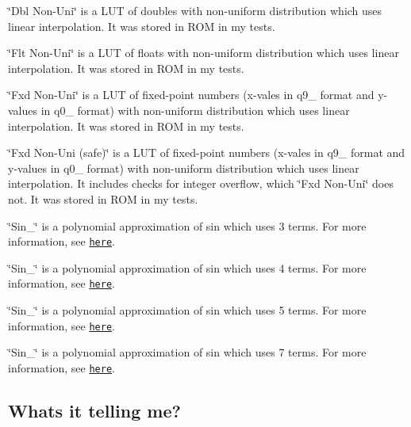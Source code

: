 \begin{DoxyEnumerate}
\item \char`\"{}\+Dbl Non-\/\+Uni\char`\"{} is a L\+UT of doubles with non-\/uniform distribution which uses linear interpolation. It was stored in R\+OM in my tests.
\item \char`\"{}\+Flt Non-\/\+Uni\char`\"{} is a L\+UT of floats with non-\/uniform distribution which uses linear interpolation. It was stored in R\+OM in my tests.
\item \char`\"{}\+Fxd Non-\/\+Uni\char`\"{} is a L\+UT of fixed-\/point numbers (x-\/vales in q9\+\_ format and y-\/values in q0\+\_ format) with non-\/uniform distribution which uses linear interpolation. It was stored in R\+OM in my tests.
\item \char`\"{}\+Fxd Non-\/\+Uni (safe)\char`\"{} is a L\+UT of fixed-\/point numbers (x-\/vales in q9\+\_ format and y-\/values in q0\+\_ format) with non-\/uniform distribution which uses linear interpolation. It includes checks for integer overflow, which \char`\"{}\+Fxd Non-\/\+Uni\char`\"{} does not. It was stored in R\+OM in my tests.
\item \char`\"{}\+Sin\+\_\char`\"{} is a polynomial approximation of sin which uses 3 terms. For more information, see \href{http://www.ganssle.com/approx.htm}{\tt here}.
\item \char`\"{}\+Sin\+\_\char`\"{} is a polynomial approximation of sin which uses 4 terms. For more information, see \href{http://www.ganssle.com/approx.htm}{\tt here}.
\item \char`\"{}\+Sin\+\_\char`\"{} is a polynomial approximation of sin which uses 5 terms. For more information, see \href{http://www.ganssle.com/approx.htm}{\tt here}.
\item \char`\"{}\+Sin\+\_\char`\"{} is a polynomial approximation of sin which uses 7 terms. For more information, see \href{http://www.ganssle.com/approx.htm}{\tt here}.
\end{DoxyEnumerate}

\subsection*{What\textquotesingle{}s it telling me?}


